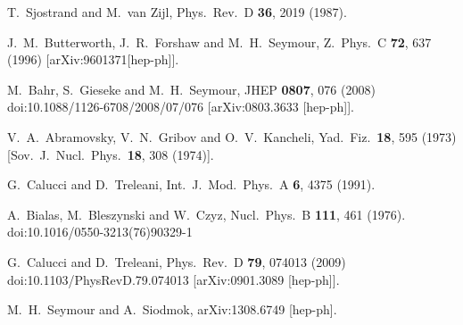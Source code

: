 \documentclass{ws-rv9x6}
\begin{document}
\begin{thebibliography}{9}
  T.~Sjostrand and M.~van Zijl,
  Phys.\ Rev.\  D {\bf 36}, 2019 (1987).

  J.~M.~Butterworth, J.~R.~Forshaw and M.~H.~Seymour,
  Z.\ Phys.\  C {\bf 72}, 637 (1996)
  [arXiv:9601371[hep-ph]].

  M.~Bahr, S.~Gieseke and M.~H.~Seymour,
  JHEP {\bf 0807}, 076 (2008)
  doi:10.1088/1126-6708/2008/07/076
  [arXiv:0803.3633 [hep-ph]].

  V.~A.~Abramovsky, V.~N.~Gribov and O.~V.~Kancheli,
  Yad.\ Fiz.\  {\bf 18}, 595 (1973)
  [Sov.\ J.\ Nucl.\ Phys.\  {\bf 18}, 308 (1974)].

  G.~Calucci and D.~Treleani,
  Int.\ J.\ Mod.\ Phys.\  A {\bf 6}, 4375 (1991).

  A.~Bialas, M.~Bleszynski and W.~Czyz,
  Nucl.\ Phys.\ B {\bf 111}, 461 (1976).
  doi:10.1016/0550-3213(76)90329-1

  G.~Calucci and D.~Treleani,
  Phys.\ Rev.\ D {\bf 79}, 074013 (2009)
  doi:10.1103/PhysRevD.79.074013
  [arXiv:0901.3089 [hep-ph]].

  M.~H.~Seymour and A.~Siodmok,
  arXiv:1308.6749 [hep-ph].


\end{thebibliography}
\end{document}
